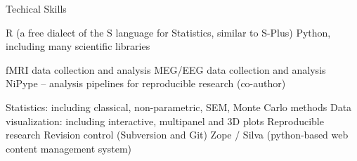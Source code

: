 \begin{rubric}{Techical Skills}

\entry* R (a free dialect of the S language for Statistics, similar to S-Plus)
\entry* Python, including many scientific libraries

\entry* fMRI data collection and analysis
\entry* MEG/EEG data collection and analysis
\entry* NiPype -- analysis pipelines for reproducible research (co-author)

\entry* Statistics: including classical, non-parametric, SEM, Monte Carlo methods
\entry* Data visualization: including interactive, multipanel and 3D plots
\entry* Reproducible research
\entry* Revision control (Subversion and Git)
\entry* Zope / Silva (python-based web content management system)

\end{rubric}
